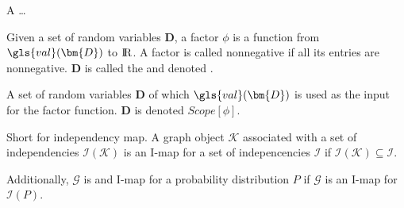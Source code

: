 
{%
  A \ldots
}

{%
  Given a \gls{set of random variables} $\bm{D}$, a factor $\phi$ is a function from $\gls{val}(\bm{D})$ to ${\rm I\!R}$. A factor is called nonnegative if all its entries are nonnegative. $\bm{D}$ is called the  and denoted .
}

{%
  A \gls{set of random variables} $\bm{D}$ of which $\gls{val}(\bm{D})$ is used as the input for the \gls{factor} function. $\bm{D}$ is denoted $Scope[\phi]$.
}

{%
  Short for independency map. A graph object $\mathcal{K}$ associated with a \gls{set of independencies} $\mathcal{I}(\mathcal{K})$ is an I-map for a set of indepencencies $\mathcal{I}$ if $\mathcal{I}(\mathcal{K})\subseteq\mathcal{I}$.

  Additionally, $\mathcal{G}$ is and I-map for a \gls{probability distribution} $P$ if $\mathcal{G}$ is an I-map for $\mathcal{I}(P)$.

}



